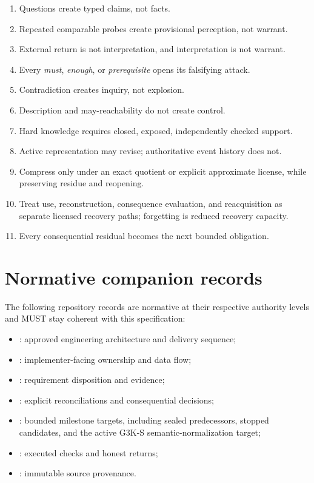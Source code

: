 \documentclass[11pt]{article}
\begin{document}
\begin{enumerate}[label=\arabic*.]
\item Questions create typed claims, not facts.
\item Repeated comparable probes create provisional perception, not warrant.
\item External return is not interpretation, and interpretation is not warrant.
\item Every \emph{must}, \emph{enough}, or \emph{prerequisite} opens its
      falsifying attack.
\item Contradiction creates inquiry, not explosion.
\item Description and may-reachability do not create control.
\item Hard knowledge requires closed, exposed, independently checked support.
\item Active representation may revise; authoritative event history does not.
\item Compress only under an exact quotient or explicit approximate license,
      while preserving residue and reopening.
\item Treat use, reconstruction, consequence evaluation, and reacquisition as
      separate licensed recovery paths; forgetting is reduced recovery capacity.
\item Every consequential residual becomes the next bounded obligation.
\end{enumerate}

\section*{Normative companion records}

The following repository records are normative at their respective authority
levels and MUST stay coherent with this specification:
\begin{itemize}
\item {}: approved engineering architecture and delivery sequence;
\item {}: implementer-facing ownership and data flow;
\item {}: requirement disposition and evidence;
\item {}: explicit reconciliations and consequential decisions;
\item {}: bounded milestone targets, including sealed predecessors,
      stopped candidates, and the active G3K-S semantic-normalization target;
\item {}: executed checks and honest returns;
\item {}: immutable source provenance.
\end{itemize}
\end{document}
